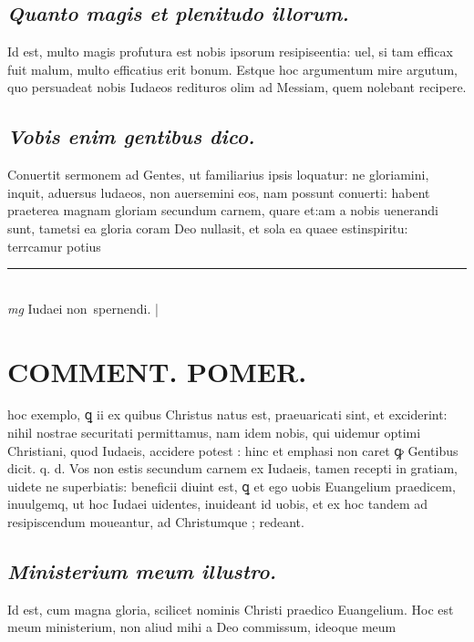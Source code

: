 \documentclass{article}
\begin{document}
\begin{pages}
\subsection*{\textit{Quanto magis et plenitudo illorum. }}\pstart Id est, multo magis profutura est nobis ipsorum resipiseentia: uel, si tam efficax fuit malum, multo efficatius erit bonum. Estque hoc argumentum mire argutum, quo persuadeat nobis Iudaeos redituros olim ad Messiam, quem nolebant recipere.  \pend
{}
{}
\subsection*{\textit{Vobis enim gentibus dico. }}\pstart Conuertit sermonem ad Gentes, ut familiarius ipsis loquatur: ne gloriamini, inquit, aduersus ludaeos, non auersemini eos, nam possunt conuerti: habent praeterea magnam gloriam secundum carnem, quare et:am a nobis uenerandi sunt, tametsi ea gloria coram Deo nullasit, et sola ea quaee estinspiritu: terrcamur potius  \pend
\vspace{0.5cm}\noindent
\vspace{0.2cm}\rule{1cm}{0.2pt}\\ 
\hspace{0.2cm}\textit{mg}
\footnotesize Iudaei non spernendi.  
\normalsize| 
\section*{COMMENT. POMER.  }\pstart hoc exemplo, ꝗ ii ex quibus Christus natus est, praeuaricati sint, et exciderint: nihil nostrae securitati permittamus, nam idem nobis, qui uidemur optimi Christiani, quod Iudaeis, accidere potest : hinc et emphasi non caret ꝙ Gentibus dicit. q. d. Vos non estis secundum carnem ex Iudaeis, tamen recepti in gratiam, uidete ne superbiatis: beneficii diuint est, ꝗ et ego uobis Euangelium praedicem, inuulgemq, ut hoc Iudaei uidentes, inuideant id uobis, et ex hoc tandem ad resipiscendum moueantur, ad Christumque ; redeant.  \pend
{}
{}
\subsection*{\textit{Ministerium meum illustro. }}\pstart Id est, cum magna gloria, scilicet nominis Christi praedico Euangelium. Hoc est meum ministerium, non aliud mihi a Deo commissum, ideoque meum\pend
{}
{}

\end{pages}
\end{document}
